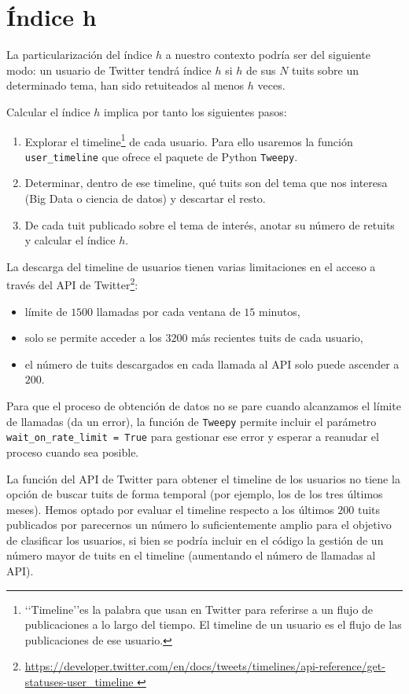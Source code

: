 \section{Índice h}
\label{subsect:indice_h}
La particularización del índice $h$ a nuestro contexto podría ser 
del siguiente modo: un usuario de Twitter tendrá índice $h$ si $h$ de sus $N$ tuits
sobre un determinado tema, han sido retuiteados al menos $h$ veces.

Calcular el índice $h$ implica por tanto los siguientes pasos:
\begin{enumerate}
\item Explorar el timeline\footnote{\lq\lq Timeline\rq\rq es la palabra
que usan en Twitter para referirse a un flujo de publicaciones a lo largo del tiempo.
El timeline de un usuario es el flujo de las publicaciones de ese usuario.} 
de cada usuario. Para ello usaremos la función
{\tt user\_timeline} que ofrece el paquete de Python {\tt Tweepy}. 
\item Determinar, dentro de ese timeline, qué tuits son del tema que nos interesa
(Big Data o ciencia de datos) y descartar el resto.
\item De cada tuit publicado sobre el tema de interés, anotar su número de 
retuits y calcular el índice $h$. 
\end{enumerate}

La descarga del timeline de usuarios tienen varias limitaciones en el acceso a través 
del API de Twitter\footnote{\url{https://developer.twitter.com/en/docs/tweets/timelines/api-reference/get-statuses-user_timeline }}:
\begin{itemize} 
\item límite de $1500$ llamadas por cada ventana de $15$ minutos,
\item solo se permite acceder a los $3200$ más recientes tuits de cada usuario,
\item el número de tuits descargados en cada llamada al API solo puede ascender a $200$.
\end{itemize}
Para que el proceso de obtención de datos no se pare cuando alcanzamos el límite
de llamadas (da un error), la función de {\tt Tweepy} permite incluir el parámetro 
{\tt wait\_on\_rate\_limit = True} para gestionar ese error y esperar a reanudar
el proceso cuando sea posible.

La función del API de Twitter para obtener el timeline de los usuarios no tiene 
la opción de buscar tuits de forma temporal (por ejemplo, los de los tres
últimos meses). Hemos optado por evaluar el timeline respecto a los últimos
$200$ tuits publicados por parecernos un número lo suficientemente amplio para 
el objetivo de clasificar los usuarios, si bien se podría incluir en el código la
gestión de un número mayor de tuits en el timeline (aumentando el número de
llamadas al API).

